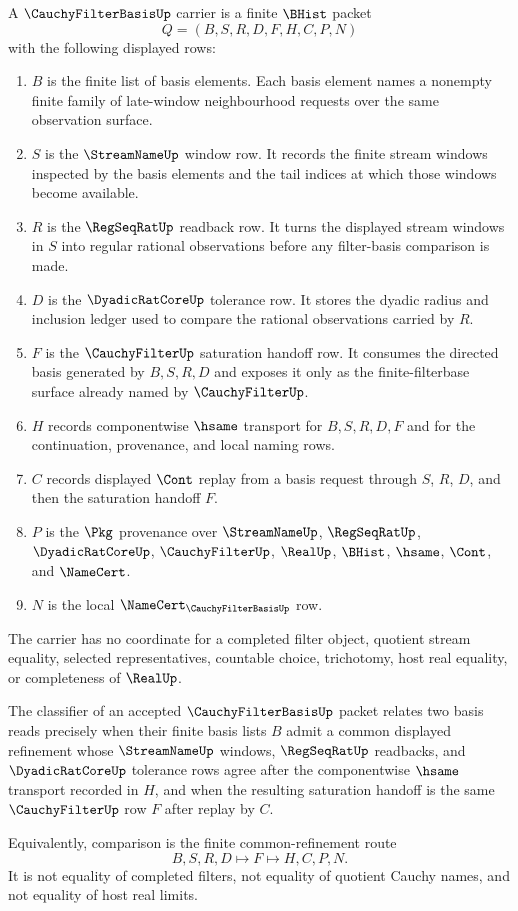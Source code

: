 \begin{definition}
\label{def:cauchy-filter-basis-carrier}
A $\CauchyFilterBasisUp$ carrier is a finite $\BHist$ packet
$$
Q=(B,S,R,D,F,H,C,P,N)
$$
with the following displayed rows:
\begin{enumerate}
\item $B$ is the finite list of basis elements. Each basis element names a nonempty finite family of late-window neighbourhood requests over the same observation surface.
\item $S$ is the $\StreamNameUp$ window row. It records the finite stream windows inspected by the basis elements and the tail indices at which those windows become available.
\item $R$ is the $\RegSeqRatUp$ readback row. It turns the displayed stream windows in $S$ into regular rational observations before any filter-basis comparison is made.
\item $D$ is the $\DyadicRatCoreUp$ tolerance row. It stores the dyadic radius and inclusion ledger used to compare the rational observations carried by $R$.
\item $F$ is the $\CauchyFilterUp$ saturation handoff row. It consumes the directed basis generated by $B,S,R,D$ and exposes it only as the finite-filterbase surface already named by $\CauchyFilterUp$.
\item $H$ records componentwise $\hsame$ transport for $B,S,R,D,F$ and for the continuation, provenance, and local naming rows.
\item $C$ records displayed $\Cont$ replay from a basis request through $S$, $R$, $D$, and then the saturation handoff $F$.
\item $P$ is the $\Pkg$ provenance over $\StreamNameUp$, $\RegSeqRatUp$, $\DyadicRatCoreUp$, $\CauchyFilterUp$, $\RealUp$, $\BHist$, $\hsame$, $\Cont$, and $\NameCert$.
\item $N$ is the local $\NameCert_{\CauchyFilterBasisUp}$ row.
\end{enumerate}
The carrier has no coordinate for a completed filter object, quotient stream equality, selected representatives, countable choice, trichotomy, host real equality, or completeness of $\RealUp$.
\end{definition}

\begin{definition}
\label{def:cauchy-filter-basis-classifier}
The classifier of an accepted $\CauchyFilterBasisUp$ packet relates two basis reads precisely when their finite basis lists $B$ admit a common displayed refinement whose $\StreamNameUp$ windows, $\RegSeqRatUp$ readbacks, and $\DyadicRatCoreUp$ tolerance rows agree after the componentwise $\hsame$ transport recorded in $H$, and when the resulting saturation handoff is the same $\CauchyFilterUp$ row $F$ after replay by $C$.

Equivalently, comparison is the finite common-refinement route
$$
B,S,R,D \longmapsto F \longmapsto H,C,P,N .
$$
It is not equality of completed filters, not equality of quotient Cauchy names, and not equality of host real limits.
\end{definition}

